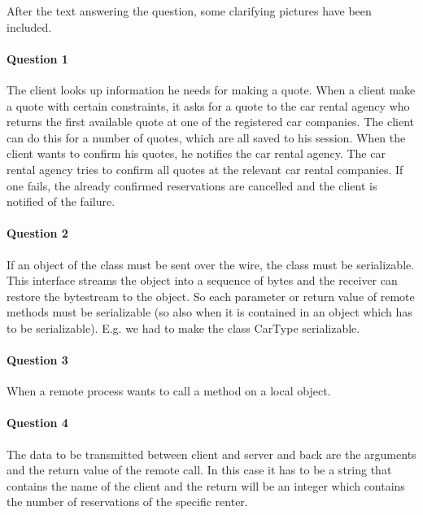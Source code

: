 \documentclass{ds-report}
\begin{document}
	\maketitle

	After the text answering the question, some clarifying pictures have been included.

	\paragraph{Question 1} 
	The client looks up information he needs for making a quote. When a client make a quote with certain constraints, it asks for a quote to the car rental agency who returns the first available quote at one of the registered car companies. 
	The client can do this for a number of quotes, which are all saved to his session. When the client wants to confirm his quotes, he notifies the car rental agency. The car rental agency tries to confirm all quotes at the relevant car rental companies. If one fails, the already confirmed reservations are cancelled and the client is notified of the failure.
	
	
	\paragraph{Question 2}
	If an object of the class must be sent over the wire, the class must be serializable. This interface streams the object into a sequence of bytes and the receiver can restore the bytestream to the object. So each parameter or return value of remote methods must be serializable  (so also when it is contained in an object which has to be serializable). E.g. we had to make the class CarType serializable. 
	
	
	\paragraph{Question 3} 
	When a remote process wants to call a method on a local object. 
	
	\paragraph{Question 4}
	The data to be transmitted between client and server and back are the arguments and the return value of the remote call. In this case it has to be a string that contains the name of the client and the return will be an integer which contains the number of reservations of the specific renter.
	
\end{document}
